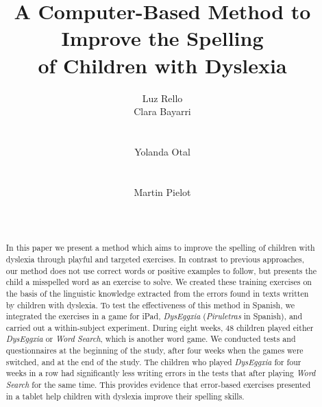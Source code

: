 \documentclass[letterpaper]{sig-alternate-2013}
\begin{document}
\title{A Computer-Based Method to Improve the Spelling \\ of Children with Dyslexia}


\author{
 \alignauthor Luz Rello \\ Clara Bayarri\\
       \\
       \\
\alignauthor Yolanda Otal  \\
       \\
       \\
\alignauthor Martin Pielot\\
    	\\
   	\\
       }
\maketitle
	
\begin{abstract}
In this paper we present a method which aims to improve the spelling of children with dyslexia through playful and targeted exercises. In contrast to previous approaches, our method does not use correct words or positive examples to follow, but presents  the child a misspelled word as an exercise to solve. We created these training exercises on the basis of the linguistic knowledge extracted from the errors found in texts written by children with dyslexia. 
To test the effectiveness of this method in Spanish, we integrated the exercises in a game for iPad, {\it DysEggxia} ({\it Piruletras} in Spanish), and carried out a within-subject experiment. During eight weeks, 48 children played either {\it DysEggxia}  or {\it Word Search}, which is another word game. We conducted tests and questionnaires at the beginning of the study, after four weeks when the games were switched, and at the end of the study. The children who played {\it DysEggxia} for four weeks in a row had significantly less writing errors in the tests that after playing {\it Word Search} for the same time. This provides evidence that  error-based exercises presented in a tablet  help children with dyslexia improve their spelling skills.
\end{abstract}
\end{document}
